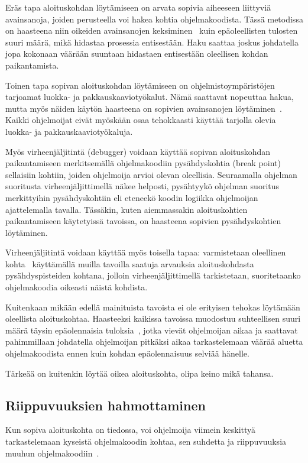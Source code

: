 \documentclass[finnish]{tktltiki2}
\theoremstyle{definition}
\theoremstyle{remark}
\begin{document}
Eräs tapa aloituskohdan löytämiseen on arvata sopivia aiheeseen liittyviä avainsanoja, joiden perusteella voi hakea kohtia ohjelmakoodista. Tässä metodissa on haasteena niin oikeiden avainsanojen keksiminen~\cite{what-to-search-for} kuin epäoleellisten tulosten suuri määrä, mikä hidastaa prosessia entisestään. Haku saattaa joskus johdatella jopa kokonaan väärään suuntaan hidastaen entisestään oleellisen kohdan paikantamista.

Toinen tapa sopivan aloituskohdan löytämiseen on ohjelmistoympäristöjen tarjoamat luokka- ja pakkauskaaviotyökalut. Nämä saattavat nopeuttaa hakua, mutta myös näiden käytön haasteena on sopivien avainsanojen löytäminen~\cite{what-to-search-for}. Kaikki ohjelmoijat eivät myöskään osaa tehokkaasti käyttää tarjolla olevia luokka- ja pakkauskaaviotyökaluja.

Myös virheenjäljitintä (debugger) voidaan käyttää sopivan aloituskohdan paikantamiseen merkitsemällä ohjelmakoodiin pysähdyskohtia (break point) sellaisiin kohtiin, joiden ohjelmoija arvioi olevan oleellisia.
Seuraamalla ohjelman suoritusta virheenjäljittimellä näkee helposti, pysähtyykö ohjelman suoritus merkittyihin pysähdyskohtiin eli eteneekö koodin logiikka ohjelmoijan ajattelemalla tavalla.
Tässäkin, kuten aiemmassakin aloituskohtien paikantamiseen käytetyissä tavoissa, on haasteena sopivien pysähdyskohtien löytäminen.

Virheenjäljitintä voidaan käyttää myös toisella tapaa: varmistetaan oleellinen kohta~\cite{eliciting-design-requirements-for-maintenance-oriented-ides} käyttämällä muilla tavoilla saatuja arvauksia aloituskohdasta pysähdyspisteiden kohtana, jolloin virheenjäljittimellä tarkistetaan, suoritetaanko ohjelmakoodia oikeasti näistä kohdista.

Kuitenkaan mikään edellä mainituista tavoista ei ole erityisen tehokas löytämään oleellista aloituskohtaa. Haasteeksi kaikissa tavoissa muodostuu suhteellisen suuri määrä täysin epäolennaisia tuloksia~\cite{eliciting-design-requirements-for-maintenance-oriented-ides}, jotka vievät ohjelmoijan aikaa ja saattavat pahimmillaan johdatella ohjelmoijan pitkäksi aikaa tarkastelemaan väärää aluetta ohjelmakoodista ennen kuin kohdan epäolennaisuus selviää hänelle.

Tärkeää on kuitenkin löytää oikea aloituskohta, olipa keino mikä tahansa.


\subsection{Riippuvuuksien hahmottaminen}
Kun sopiva aloituskohta on tiedossa, voi ohjelmoija viimein keskittyä tarkastelemaan kyseistä ohjelmakoodin kohtaa, sen suhdetta ja riippuvuuksia muuhun ohjelmakoodiin~\cite{questions-during-software-evolution-tasks}.
\end{document}

